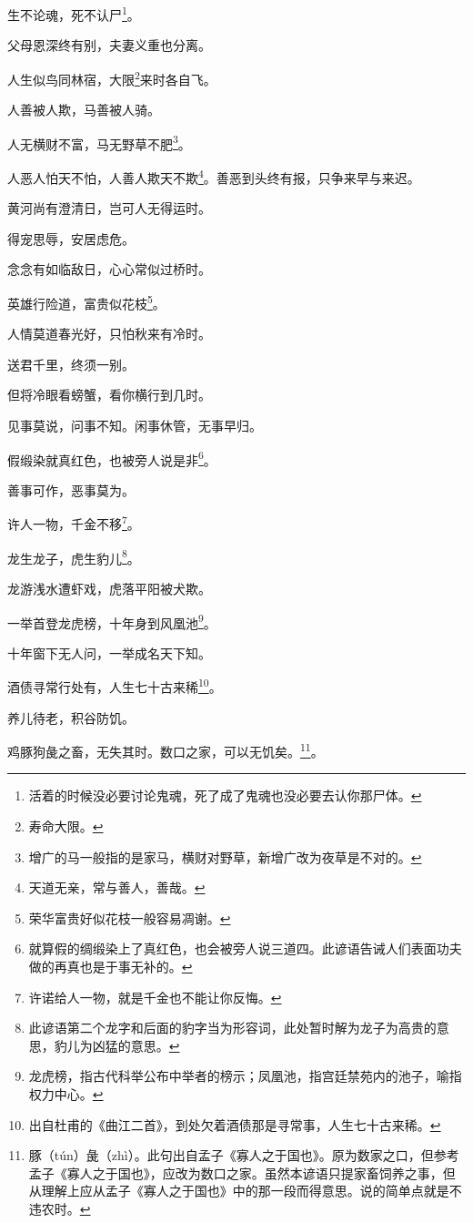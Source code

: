 \documentclass[12pt,oneside]{book}
\begin{document}
生不论魂，死不认尸\footnote{活着的时候没必要讨论鬼魂，死了成了鬼魂也没必要去认你那尸体。}。

父母恩深终有别，夫妻义重也分离。

人生似鸟同林宿，大限\footnote{寿命大限。}来时各自飞。

人善被人欺，马善被人骑。

人无横财不富，马无野草不肥\footnote{增广的马一般指的是家马，横财对野草，新增广改为夜草是不对的。}。

人恶人怕天不怕，人善人欺天不欺\footnote{天道无亲，常与善人，善哉。}。善恶到头终有报，只争来早与来迟。

黄河尚有澄清日，岂可人无得运时。

得宠思辱，安居虑危。

念念有如临敌日，心心常似过桥时。

英雄行险道，富贵似花枝\footnote{荣华富贵好似花枝一般容易凋谢。}。

人情莫道春光好，只怕秋来有冷时。

送君千里，终须一别。

但将冷眼看螃蟹，看你横行到几时。

见事莫说，问事不知。闲事休管，无事早归。

假缎染就真红色，也被旁人说是非\footnote{就算假的绸缎染上了真红色，也会被旁人说三道四。此谚语告诫人们表面功夫做的再真也是于事无补的。}。

善事可作，恶事莫为。

许人一物，千金不移\footnote{许诺给人一物，就是千金也不能让你反悔。}。

龙生龙子，虎生豹儿\footnote{此谚语第二个龙字和后面的豹字当为形容词，此处暂时解为龙子为高贵的意思，豹儿为凶猛的意思。}。

龙游浅水遭虾戏，虎落平阳被犬欺。

一举首登龙虎榜，十年身到风凰池\footnote{龙虎榜，指古代科举公布中举者的榜示；凤凰池，指宫廷禁苑内的池子，喻指权力中心。}。

十年窗下无人问，一举成名天下知。

酒债寻常行处有，人生七十古来稀\footnote{出自杜甫的《曲江二首》，到处欠着酒债那是寻常事，人生七十古来稀。}。

养儿待老，积谷防饥。

鸡豚狗彘之畜，无失其时。数口之家，可以无饥矣。\footnote{豚（tún）彘（zhì）。此句出自孟子《寡人之于国也》。原为数家之口，但参考孟子《寡人之于国也》，应改为数口之家。虽然本谚语只提家畜饲养之事，但从理解上应从孟子《寡人之于国也》中的那一段而得意思。说的简单点就是不违农时。}。
\end{document}
